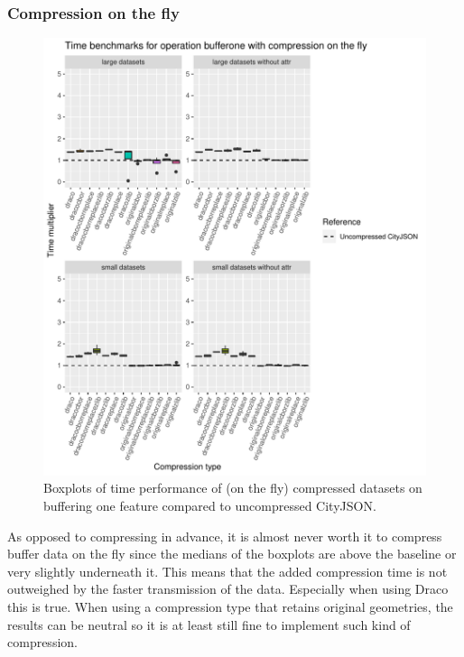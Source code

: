 \subsubsection{Compression on the fly}

\begin{figure}[h!]
    \includegraphics[scale=0.92]{figs/benchmark/individualotf/bufferone.pdf}
    \caption{Boxplots of time performance of (on the fly) compressed datasets on buffering one feature compared to uncompressed CityJSON.}
    \label{figotf:sdvis}
\end{figure}

As opposed to compressing in advance, it is almost never worth it to compress buffer data on the fly since the medians of the boxplots are above the baseline or very slightly underneath it.
This means that the added compression time is not outweighed by the faster transmission of the data.
Especially when using Draco this is true.
When using a compression type that retains original geometries, the results can be neutral so it is at least still fine to implement such kind of compression.


